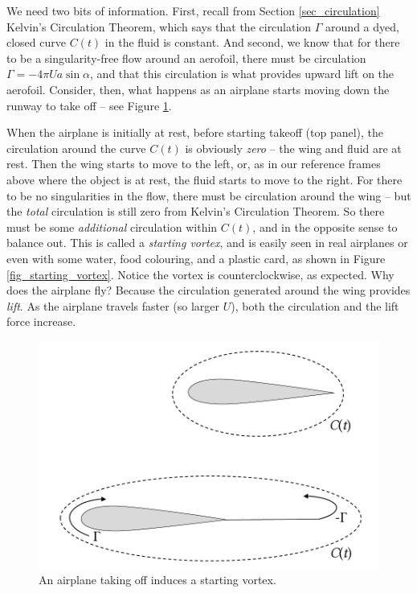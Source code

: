 We need two bits of information.  First, recall from Section \ref{sec_circulation} Kelvin's Circulation Theorem, which says that the circulation $\Gamma$ around a dyed, closed curve $C(t)$ in the fluid is constant.  And second, we know that for there to be a singularity-free flow around an aerofoil, there must be circulation $\Gamma = -4\pi Ua \sin \alpha$, and that this circulation is what provides upward lift on the aerofoil.  Consider, then, what happens as an airplane starts moving down the runway to take off -- see Figure \ref{fig_airplane}.

When the airplane is initially at rest, before starting takeoff (top panel), the circulation around the curve $C(t)$ is obviously \emph{zero} -- the wing and fluid are at rest.  Then the wing starts to move to the left, or, as in our reference frames above where the object is at rest, the fluid starts to move to the right.  For there to be no singularities in the flow, there must be circulation around the wing -- but the \emph{total} circulation is still zero from Kelvin's Circulation Theorem.  So there must be some \emph{additional} circulation within $C(t)$, and in the opposite sense to balance out.  This is called a \emph{starting vortex}, and is easily seen in real airplanes or even with some water, food colouring, and a plastic card, as shown in Figure \ref{fig_starting_vortex}.  Notice the vortex is counterclockwise, as expected.  Why does the airplane fly?  Because the circulation generated around the wing provides \emph{lift}.  As the airplane travels faster (so larger $U$), both the circulation and the lift force increase.

\begin{figure}
\centering\includegraphics[width=0.8\linewidth]{Figures/Chapter4/fig_airplane}
\caption{An airplane taking off induces a starting vortex.}
\label{fig_airplane}
\end{figure}

